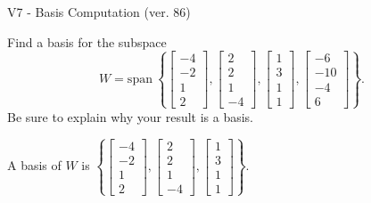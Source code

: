 \begin{exercise}
  \begin{exerciseTitle}V7 - Basis Computation (ver. 86)\end{exerciseTitle}
  \begin{exerciseStatement}
    Find a basis for the subspace 
\[W=\mathrm{span}\ \left\{\left[\begin{array}{r}
-4 \\
-2 \\
1 \\
2
\end{array}\right] , \left[\begin{array}{r}
2 \\
2 \\
1 \\
-4
\end{array}\right] , \left[\begin{array}{r}
1 \\
3 \\
1 \\
1
\end{array}\right] , \left[\begin{array}{r}
-6 \\
-10 \\
-4 \\
6
\end{array}\right]\right\}.\]
 Be sure to explain why your result is a basis.


  \end{exerciseStatement}
  \begin{exerciseAnswer}
   A basis of \(W\) is  \(\left\{\left[\begin{array}{r}
-4 \\
-2 \\
1 \\
2
\end{array}\right] , \left[\begin{array}{r}
2 \\
2 \\
1 \\
-4
\end{array}\right] , \left[\begin{array}{r}
1 \\
3 \\
1 \\
1
\end{array}\right]\right\}\).
  


  \end{exerciseAnswer}
\end{exercise}